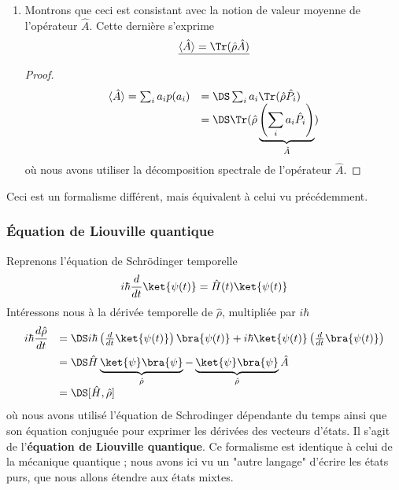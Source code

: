 \begin{enumerate}
\begin{proof}
\end{proof}
Ceci est cohérent avec ce que nous avions obtenu avec l'observable $\vec{r}$
\begin{equation}
\hat{P_{\vec{r}}} = \ket{\vec{r}}\bra{\vec{r}}\quad\rightarrow\quad p(\vec{r}) = \Tr(\hat{\rho}\ket{\vec{r}}\bra{\vec{r}})
= \bra{\vec{r}}\hat{\rho}\ket{\vec{r}}
\end{equation}
\item Montrons que ceci est consistant avec la notion de valeur moyenne de l'opérateur $\hat{A}$. Cette dernière s'exprime
\begin{equation}
\underline{\langle\hat{A}\rangle = \Tr(\hat{\rho}\hat{A})}
\end{equation}
\begin{proof}
\begin{equation}
\begin{array}{ll}
\langle\hat{A}\rangle = \sum_i a_ip(a_i) &=\DS \sum_i a_i\Tr(\hat{\rho}\hat{P_i})\\
&=\DS \Tr(\hat{\rho}\underbrace{\left(\sum_i a_i\hat{P_i}\right)}_{\hat{A}})
\end{array}
\end{equation}
où nous avons  utiliser la décomposition spectrale de l'opérateur $\hat{A}$.
\end{proof}
\end{enumerate}
Ceci est un formalisme différent, mais équivalent à celui vu précédemment.

\subsubsection{Équation de Liouville quantique}
Reprenons l'équation de Schrödinger temporelle
\begin{equation}
i\hbar \frac{d}{dt}\ket{\psi(t)} = \hat{H}(t)\ket{\psi(t)}
\end{equation}
Intéressons nous à la dérivée temporelle de $\hat{\rho}$, multipliée par $i\hbar$
\begin{equation}
\begin{array}{ll}
i\hbar\dfrac{d\hat{\rho}}{dt} &=\DS i\hbar\left(\frac{d}{dt}\ket{\psi(t)}\right)\bra{\psi(t)} + i\hbar\ket{\psi(t)}\left(
\frac{d}{dt}\bra{\psi(t)}\right)\vspace{2mm}\\
&=\DS \hat{H}\underbrace{\ket{\psi}\bra{\psi}}_{\hat{\rho}}-\underbrace{\ket{\psi}\bra{\psi}}_{\hat{\rho}}\hat{A}\\
&=\DS [\hat{H},\hat{\rho}]
\end{array}
\end{equation}
où nous avons utilisé l'équation de Schrodinger dépendante du temps ainsi que son équation conjuguée pour 
exprimer les dérivées des vecteurs d'états. Il s'agit de l'\textbf{équation de Liouville quantique}. Ce 
formalisme est identique à celui de la mécanique quantique ; nous avons ici vu un "autre langage" d'écrire les 
états purs, que nous allons étendre aux états mixtes. \\

